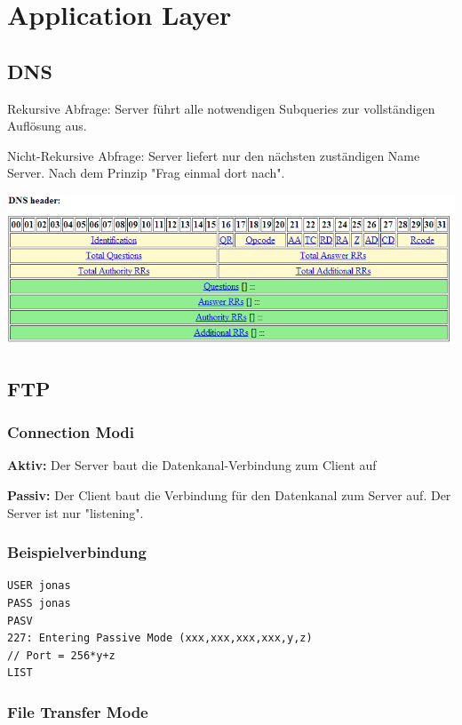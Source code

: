 \section{Application Layer}

\subsection{DNS}

Rekursive Abfrage: Server führt alle notwendigen Subqueries zur vollständigen
Auflösung aus.

Nicht-Rekursive Abfrage: Server liefert nur den nächsten zuständigen Name
Server. Nach dem Prinzip "Frag einmal dort nach".

\includegraphics[width=\textwidth]{media/DNSHeader.png}

\subsection{FTP}

\subsubsection{Connection Modi}

\textbf{Aktiv:} Der Server baut die Datenkanal-Verbindung zum Client auf

\textbf{Passiv:} Der Client baut die Verbindung für den Datenkanal zum Server auf. Der
Server ist nur "listening".

\subsubsection{Beispielverbindung}

\begin{verbatim}
USER jonas
PASS jonas
PASV
227: Entering Passive Mode (xxx,xxx,xxx,xxx,y,z)
// Port = 256*y+z
LIST
\end{verbatim}

\subsubsection{File Transfer Mode}

